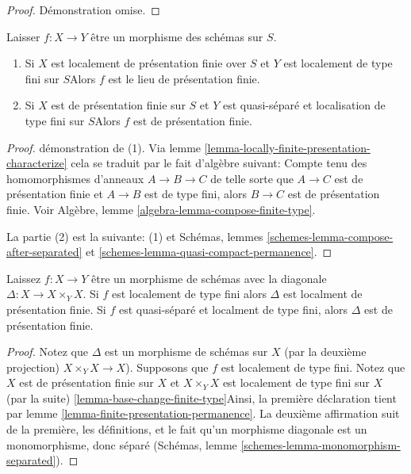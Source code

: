 \begin{proof}
Démonstration omise.
\end{proof}

\begin{lemma}

\label{lemma-finite-presentation-permanence}

Laisser $f : X \to Y$ être un morphisme des schémas sur $S$.

\begin{enumerate}

\item Si $X$ est localement de présentation finie over $S$ et
$Y$ est localement de type fini sur $S$Alors $f$ est le lieu de présentation finie.
\item Si $X$ est de présentation finie sur $S$ et $Y$ est quasi-séparé et localisation de type fini sur $S$Alors $f$ est de présentation finie.

\end{enumerate}

\end{lemma}

\begin{proof}
démonstration de (1). Via lemme \ref{lemma-locally-finite-presentation-characterize} cela se traduit par le fait d'algèbre suivant: Compte tenu des homomorphismes d'anneaux $A \to B \to C$ de telle sorte que $A \to C$ est de présentation finie et $A \to B$ est de type fini, alors $B \to C$ est de présentation finie. Voir Algèbre, lemme \ref{algebra-lemma-compose-finite-type}.

\medskip\noindent
La partie (2) est la suivante: (1) et Schémas, lemmes \ref{schemes-lemma-compose-after-separated} et \ref{schemes-lemma-quasi-compact-permanence}.
\end{proof}

\begin{lemma}

\label{lemma-diagonal-morphism-finite-type}
Laissez $f : X \to Y$ être un morphisme de schémas avec la diagonale $\Delta : X \to X \times_Y X$. Si $f$ est localement de type fini alors $\Delta$ est localment de présentation finie. Si $f$ est quasi-séparé et localment de type fini, alors $\Delta$ est de présentation finie.
\end{lemma}

\begin{proof}

Notez que $\Delta$ est un morphisme de schémas sur $X$ (par la deuxième projection) $X \times_Y X \to X$). Supposons que $f$ est localement de type fini. Notez que $X$ est de présentation finie sur $X$ et $X \times_Y X$ est localement de type fini sur $X$ (par la suite) \ref{lemma-base-change-finite-type}Ainsi, la première déclaration tient par lemme \ref{lemma-finite-presentation-permanence}. La deuxième affirmation suit de la première, les définitions, et le fait qu'un morphisme diagonale est un monomorphisme, donc séparé (Schémas, lemme \ref{schemes-lemma-monomorphism-separated}).

\end{proof}








